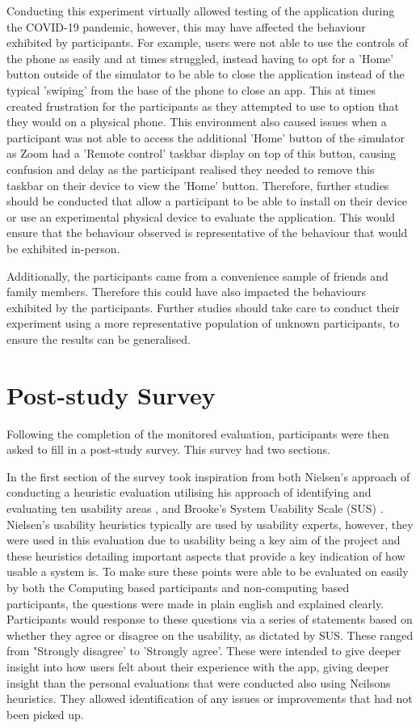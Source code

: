 \documentclass{l4proj}
\begin{document}
Conducting this experiment virtually allowed testing of the application during the COVID-19 pandemic, however, this may have affected the behaviour exhibited by participants. For example, users were not able to use the controls of the phone as easily and at times struggled, instead having to opt for a 'Home' button outside of the simulator to be able to close the application instead of the typical 'swiping' from the base of the phone to close an app. This at times created frustration for the participants as they attempted to use to option that they would on a physical phone. This environment also caused issues when a participant was not able to access the additional 'Home' button of the simulator as Zoom had a 'Remote control' taskbar display on top of this button, causing confusion and delay as the participant realised they needed to remove this taskbar on their device to view the 'Home' button. Therefore, further studies should be conducted that allow a participant to be able to install on their device or use an experimental physical device to evaluate the application. This would ensure that the behaviour observed is representative of the behaviour that would be exhibited in-person.

Additionally, the participants came from a convenience sample of friends and family members. Therefore this could have also impacted the behaviours exhibited by the participants. Further studies should take care to conduct their experiment using a more representative population of unknown participants, to ensure the results can be generalised.


\section{Post-study Survey}
Following the completion of the monitored evaluation, participants were then asked to fill in a post-study survey. This survey had two sections.

In the first section of the survey took inspiration from both Nielsen’s approach of conducting a heuristic evaluation utilising his approach of identifying and evaluating ten usability areas \citep{Nielsen10}, and Brooke's System Usability Scale (SUS) \citep{affairs_system_2013}. Nielsen's usability heuristics typically are used by usability experts, however, they were used in this evaluation due to usability being a key aim of the project and these heuristics detailing important aspects that provide a key indication of how usable a system is. To make sure these points were able to be evaluated on easily by both the Computing based participants and non-computing based participants, the questions were made in plain english and explained clearly. Participants would response to these questions via a series of statements based on whether they agree or disagree on the usability, as dictated by SUS. These ranged from "Strongly disagree' to 'Strongly agree'. These were intended to give deeper insight into how users felt about their experience with the app, giving deeper insight than the personal evaluations that were conducted also using Neilsons heuristics. They allowed identification of any issues or improvements that had not been picked up. 
\end{document}
